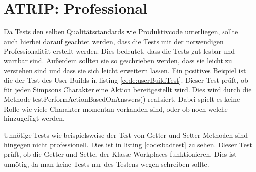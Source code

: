 \section{ATRIP: Professional}
Da Tests den selben Qualitätsstandards wie Produktivcode unterliegen, sollte auch hierbei darauf geachtet werden, dass die Tests mit der notwendigen Professionalität erstellt werden. Dies bedeutet, dass die Tests gut lesbar und wartbar sind. Außerdem sollten sie so geschrieben werden, dass sie leicht zu verstehen sind und dass sie sich leicht erweitern lassen. Ein positives Beispiel ist die der Test des User Builds in listing \ref{code:userBuildTest}. Dieser Test prüft, ob für jeden Simpsons Charakter eine Aktion bereitgestellt wird. Dies wird durch die Methode testPerformActionBasedOnAnswers() realisiert. Dabei spielt es keine Rolle wie viele Charakter momentan vorhanden sind, oder ob noch welche hinzugefügt werden. 
 
\newpage

Unnötige Tests wie beispielsweise der Test von Getter und Setter Methoden sind hingegen nicht professionell. Dies ist in listing \ref{code:badtest} zu sehen. Dieser Test prüft, ob die Getter und Setter der Klasse Workplaces funktionieren. Dies ist unnötig, da man keine Tests nur des Testens wegen schreiben sollte.

\newpage


